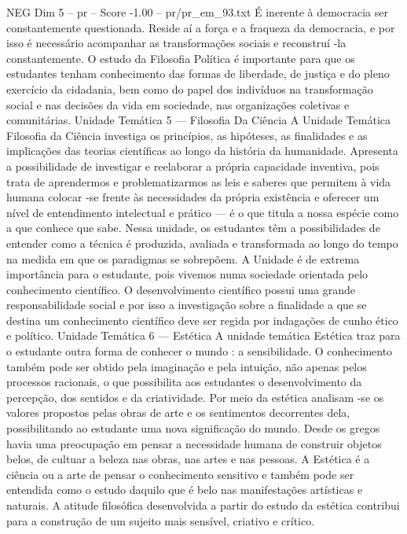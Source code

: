 \begin{textsample}{NEG Dim 5 – pr – Score -1.00 – pr/pr\_em\_93.txt}
É inerente à democracia ser constantemente questionada.
Reside aí a força e a fraqueza da democracia, e por isso é necessário acompanhar as transformações sociais e reconstruí -la constantemente.
O estudo da Filosofia Política é importante para que os estudantes tenham conhecimento das formas de liberdade, de justiça e do pleno exercício da cidadania, bem como do papel dos indivíduos na transformação social e nas decisões da vida em sociedade, nas organizações coletivas e comunitárias.
Unidade Temática 5 — Filosofia Da Ciência A Unidade Temática Filosofia da Ciência investiga os princípios, as hipóteses, as finalidades e as implicações das teorias científicas ao longo da história da humanidade.
Apresenta a possibilidade de investigar e reelaborar a própria capacidade inventiva, pois trata de aprendermos e problematizarmos as leis e saberes que permitem à vida humana colocar -se frente às necessidades da própria existência e oferecer um nível de entendimento intelectual e prático — é o que titula a nossa espécie como a que conhece que sabe.
Nessa unidade, os estudantes têm a possibilidades de entender como a técnica é produzida, avaliada e transformada ao longo do tempo na medida em que os paradigmas se sobrepõem.
A Unidade é de extrema importância para o estudante, pois vivemos numa sociedade orientada pelo conhecimento científico.
O desenvolvimento científico possui uma grande responsabilidade social e por isso a investigação sobre a finalidade a que se destina um conhecimento científico deve ser regida por indagações de cunho ético e político.
Unidade Temática 6 — Estética A unidade temática Estética traz para o estudante outra forma de conhecer o mundo : a sensibilidade.
O conhecimento também pode ser obtido pela imaginação e pela intuição, não apenas pelos processos racionais, o que possibilita aos estudantes o desenvolvimento da percepção, dos sentidos e da criatividade.
Por meio da estética analisam -se os valores propostos pelas obras de arte e os sentimentos decorrentes dela, possibilitando ao estudante uma nova significação do mundo.
Desde os gregos havia uma preocupação em pensar a necessidade humana de construir objetos belos, de cultuar a beleza nas obras, nas artes e nas pessoas.
A Estética é a ciência ou a arte de pensar o conhecimento sensitivo e também pode ser entendida como o estudo daquilo que é belo nas manifestações artísticas e naturais.
A atitude filosófica desenvolvida a partir do estudo da estética contribui para a construção de um sujeito mais sensível, criativo e crítico.

\end{textsample}
